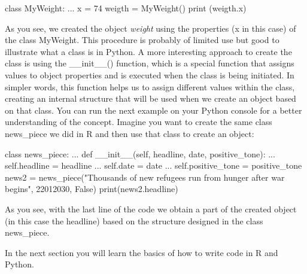 \begin{examplepy}
class MyWeight:
...    	 x = 74
weigth = MyWeight()
print (weigth.x)
\end{examplepy}

As you see, we created the object \emph{weight} using the properties (x in this case) of the class MyWeight. This procedure is probably of limited use but good to illustrate what a class is in Python. A more interesting approach to create the class is using the \_\_init\_\_() function, which is a special function that assigns values to object properties and is executed when the class is being initiated. In simpler words, this function helps us to assign different values within the class, creating an internal structure that will be used when we create an object based on that class. You can run the next example on your Python console for a better understanding of the concept. Imagine you want to create the same class news\_piece we did in R and then use that class to create an object:

\begin{examplepy}
class news_piece:
...     def __init__(self, headline, date, positive_tone):
...             self.headline = headline
...             self.date = date
...             self.positive_tone = positive_tone
news2 = news_piece("Thousands of new refugees run from hunger after war begins", 22012030, False)
print(news2.headline)
\end{examplepy}

As you see, with the last line of the code we obtain a part of the created object (in this case the headline) based on the structure designed in the class news\_piece.

In the next section you will learn the basics of how to write code in R and Python.
